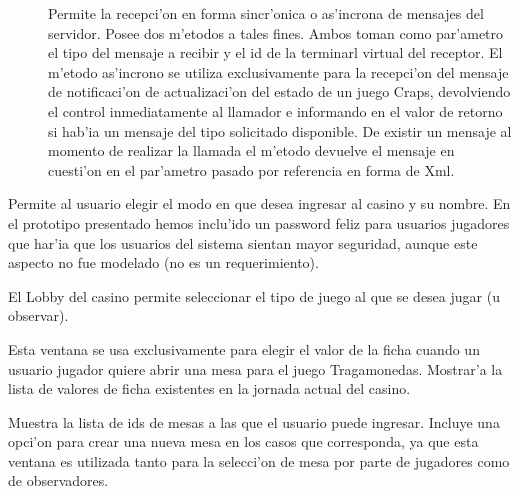 \begin{description}
\item[] Permite la recepci'on en forma sincr'onica o as'incrona de mensajes del servidor. Posee dos m'etodos a tales fines. Ambos toman como par'ametro el tipo del mensaje a recibir y el id de la terminarl virtual del receptor. El m'etodo as'incrono se utiliza exclusivamente para la recepci'on del mensaje de notificaci'on de actualizaci'on del estado de un juego Craps, devolviendo el control inmediatamente al llamador e informando en el valor de retorno si hab'ia un mensaje del tipo solicitado disponible. De existir un mensaje al momento de realizar la llamada el m'etodo devuelve el mensaje en cuesti'on en el par'ametro pasado por referencia en forma de Xml.
\end{description}


Permite al usuario elegir el modo en que desea ingresar al casino y su nombre. En el prototipo presentado hemos inclu'ido un password feliz para usuarios jugadores que har'ia que los usuarios del sistema sientan mayor seguridad, aunque este aspecto no fue modelado (no es un requerimiento).
\clearpage

El Lobby del casino permite seleccionar el tipo de juego al que se desea jugar (u observar).
\clearpage

Esta ventana se usa exclusivamente para elegir el valor de la ficha cuando un usuario jugador quiere abrir una mesa para el juego Tragamonedas. Mostrar'a la lista de valores de ficha existentes en la jornada actual del casino.
\clearpage

Muestra la lista de ids de mesas a las que el usuario puede ingresar. Incluye una opci'on para crear una nueva mesa en los casos que corresponda, ya que esta ventana es utilizada tanto para la selecci'on de mesa por parte de jugadores como de observadores.
\clearpage

